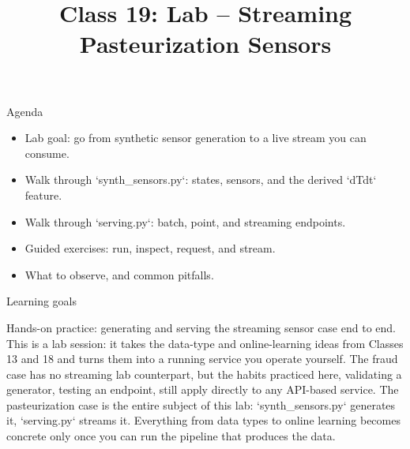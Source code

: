 

\title{Class 19: Lab -- Streaming Pasteurization Sensors}
\author{\coursename}
\date{}



\frame{\titlepage \coursefooter}

\begin{frame}{Agenda}
\begin{itemize}
\item Lab goal: go from synthetic sensor generation to a live stream you can consume.
\item Walk through `synth_sensors.py`: states, sensors, and the derived `dTdt` feature.
\item Walk through `serving.py`: batch, point, and streaming endpoints.
\item Guided exercises: run, inspect, request, and stream.
\item What to observe, and common pitfalls.
\end{itemize}
\coursefooter
\end{frame}

\begin{frame}{Learning goals}
\coursefooter
\end{frame}

\coursecontextframe
{Hands-on practice: generating and serving the streaming sensor case end to end.}
{This is a lab session: it takes the data-type and online-learning ideas from Classes 13 and 18 and turns them into a running service you operate yourself.}
{The fraud case has no streaming lab counterpart, but the habits practiced here, validating a generator, testing an endpoint, still apply directly to any API-based service.}
{The pasteurization case is the entire subject of this lab: `synth_sensors.py` generates it, `serving.py` streams it.}
{Everything from data types to online learning becomes concrete only once you can run the pipeline that produces the data.}

